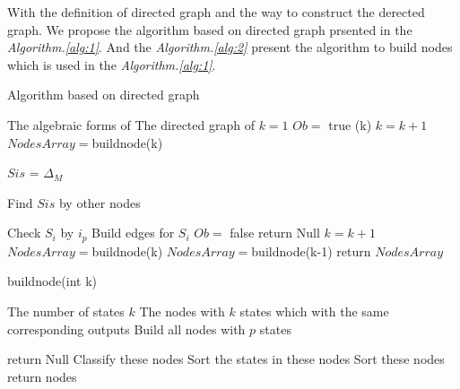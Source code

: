 With the definition of directed graph and the way to construct the derected graph. We propose the algorithm based on directed graph prsented in the {\em Algorithm.\ref{alg:1}}. And the {\em Algorithm.\ref{alg:2}} present the algorithm to build nodes which is used in the {\em Algorithm.\ref{alg:1}}.

\begin{algorithm}[h]
\caption{Algorithm based on directed graph}
\begin{algorithmic}[1]
\REQUIRE 
The algebraic forms of \BCN
\ENSURE  
The directed graph of \BCN
\STATE  $k=1$ %
\STATE  $Ob=$ true %
(k)
\STATE $k= k+1$
\STATE $NodesArray=${\sf buildnode}(k)

\STATE $Sis$ = $\Delta_M$ 
\ELSE

\STATE Find $Sis$ by other nodes

\ENDIF
{}
\STATE Check $S_i$ by $i_p$
\STATE Build edges for $S_i$ 
\ENDFOR
{}
\STATE  $Ob=$ false 
\STATE return Null
\ENDIF
\ENDFOR
\STATE $k= k+1$
\STATE $NodesArray=${\sf buildnode}(k)
\ENDWHILE
\STATE $NodesArray=${\sf buildnode}(k-1)
\STATE return $NodesArray$
\end{algorithmic}
 \label{alg:1}
\end{algorithm}
\begin{algorithm}[h!]
\caption{{\sf buildnode}(int k)}
\begin{algorithmic}[1]
\REQUIRE 
The number of states $k$
\ENSURE  
The nodes with $k$ states which with the same corresponding outputs %
\STATE  Build all nodes with $p$ states %

\STATE  return Null
\ELSE 
\STATE  Classify these nodes
\STATE Sort the states in these nodes
\STATE Sort these nodes%
\STATE return nodes
\ENDIF 
\end{algorithmic}
 \label{alg:2}
\end{algorithm}


